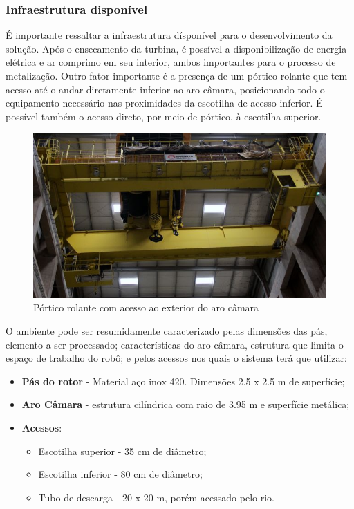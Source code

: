 \subsubsection{Infraestrutura disponível}
É importante ressaltar a infraestrutura dísponível para o desenvolvimento da solução. 
Após o ensecamento da turbina, é possível a disponibilização de energia elétrica
e ar comprimo em seu interior, ambos importantes para o processo de metalização. Outro fator 
importante é a presença de um pórtico rolante que tem acesso até o andar diretamente 
inferior ao aro câmara, posicionando todo o equipamento necessário nas proximidades 
da escotilha de acesso inferior. É possível também o acesso direto, por meio de pórtico, 
à escotilha superior.

\begin{figure}[h!]	
	\centering
	\includegraphics[width=0.8\columnwidth]{sota/figs/viagem/img_4989}
	\caption{Pórtico rolante com acesso ao exterior do aro câmara}
	\label{fig::portico}
\end{figure}


O ambiente pode ser resumidamente caracterizado pelas dimensões das pás,
elemento a ser processado; características do aro câmara, estrutura que limita o
espaço de trabalho do robô; e pelos acessos nos quais o sistema terá que
utilizar:

\begin{itemize}
  \item \textbf{Pás do rotor} - Material aço inox 420. Dimensões 2.5 x 2.5 m de superfície;
  \item \textbf{Aro Câmara} - estrutura cilíndrica com raio de 3.95 m e
  superfície metálica;
  \item \textbf{Acessos}: 
  	\begin{itemize}
    	\item Escotilha superior - 35 cm de diâmetro;
  		\item Escotilha inferior - 80 cm de diâmetro;
  		\item Tubo de descarga - 20 x 20 m, porém acessado pelo rio. 
  	\end{itemize}
\end{itemize}






